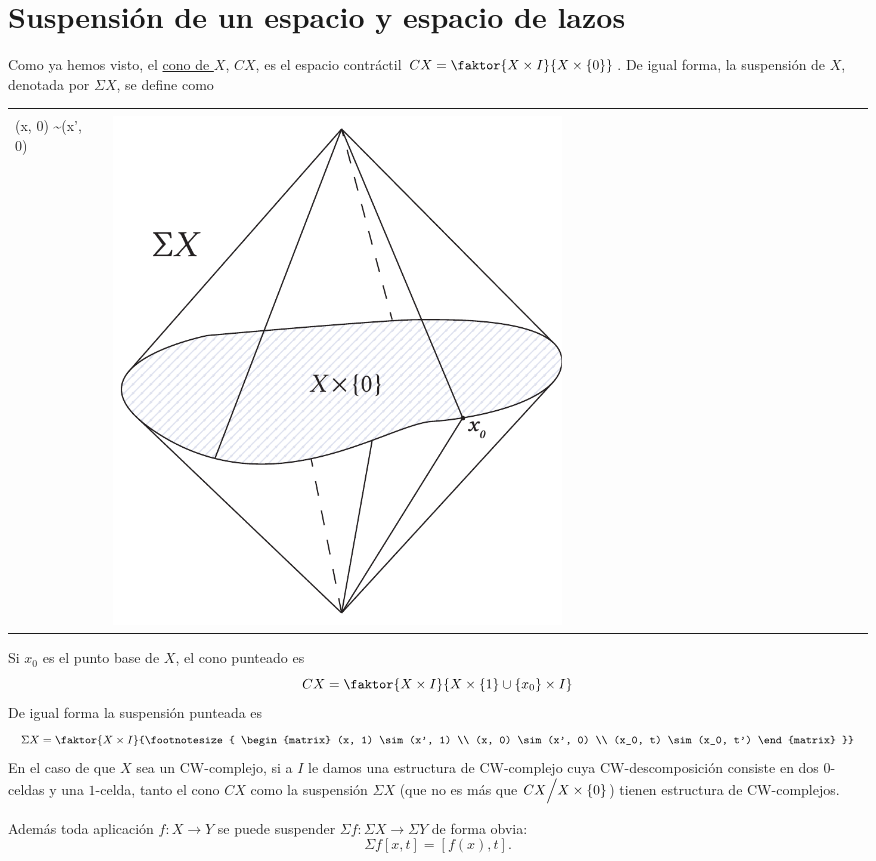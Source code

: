 \section{Suspensión de un espacio y espacio de lazos}
Como ya hemos visto, el \hyperlink{ecom:cono}{cono de $X$}, $CX$, es el espacio contráctil $CX = \faktor{X \times I }{X \times \{ 0 \}}$. De igual forma, la suspensión de $X$, denotada por $\Sigma X$, se define como \par 
\begin{tabular}{ll}
\begin{minipage}{0.5\textwidth}
\[ \Sigma X =  \faktor{X \times I}
{ \footnotesize{\begin{matrix}
(x, 1) \sim (x', 1) \\
(x, 0) \sim (x', 0)
\end{matrix}}} \] 
\end{minipage}
&
\begin{minipage}{0.5\textwidth}
\includegraphics[width=0.6\textwidth]{images/suspensionalt.pdf}
\end{minipage}
\end{tabular}
Si $x_0$ es el punto base de $X$, el cono punteado es
\[ CX = \faktor{X \times I}{X \times \{ 1 \}  \cup \{ x_0 \} \times I}\]
De igual forma la suspensión punteada es 
\[ \Sigma X = \faktor{ X \times I }
{\footnotesize{ \begin{matrix}
(x, 1) \sim (x', 1) \\ 
(x, 0) \sim (x', 0) \\ 
(x_0, t) \sim (x_0, t')
\end{matrix} }} \]
En el caso de que $X$ sea un CW-complejo, si a $I$ le damos una  estructura de CW-complejo cuya CW-descomposición consiste en dos $0$-celdas y una $1$-celda, tanto el cono $CX$ como la suspensión $\Sigma X$ (que no es más que $CX \Bign/ X \times \{ 0 \}$) tienen estructura de CW-complejos. \par
Además toda aplicación $f : X \longrightarrow Y$ se puede suspender $\Sigma f : \Sigma X \longrightarrow \Sigma Y$ de forma obvia:
\[\Sigma f [x, t] = [f(x), t]. \]

